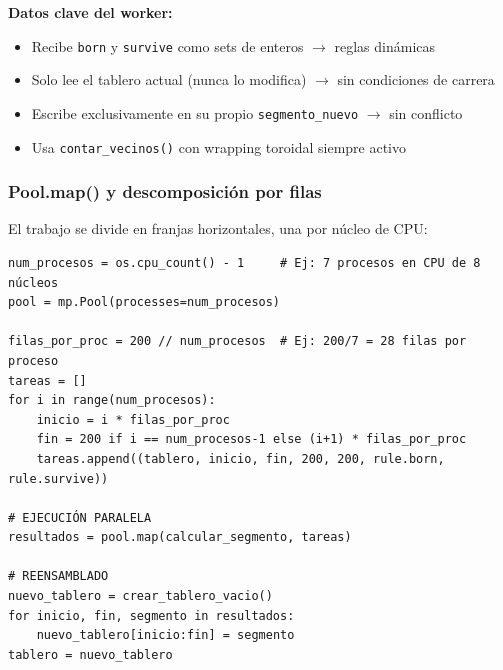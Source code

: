 \documentclass[12pt,a4paper]{article}
\begin{document}
\textbf{Datos clave del worker:}
\begin{itemize}
  \item Recibe \texttt{born} y \texttt{survive} como sets de enteros $\to$ reglas dinámicas
  \item Solo lee el tablero actual (nunca lo modifica) $\to$ sin condiciones de carrera
  \item Escribe exclusivamente en su propio \texttt{segmento\_nuevo} $\to$ sin conflicto
  \item Usa \texttt{contar\_vecinos()} con wrapping toroidal siempre activo
\end{itemize}

\subsubsection{Pool.map() y descomposición por filas}

El trabajo se divide en franjas horizontales, una por núcleo de CPU:

\begin{lstlisting}
num_procesos = os.cpu_count() - 1     # Ej: 7 procesos en CPU de 8 núcleos
pool = mp.Pool(processes=num_procesos)

filas_por_proc = 200 // num_procesos  # Ej: 200/7 = 28 filas por proceso
tareas = []
for i in range(num_procesos):
    inicio = i * filas_por_proc
    fin = 200 if i == num_procesos-1 else (i+1) * filas_por_proc
    tareas.append((tablero, inicio, fin, 200, 200, rule.born, rule.survive))

# EJECUCIÓN PARALELA
resultados = pool.map(calcular_segmento, tareas)

# REENSAMBLADO
nuevo_tablero = crear_tablero_vacio()
for inicio, fin, segmento in resultados:
    nuevo_tablero[inicio:fin] = segmento
tablero = nuevo_tablero
\end{lstlisting}

\begin{center}
\end{center}
\end{document}
